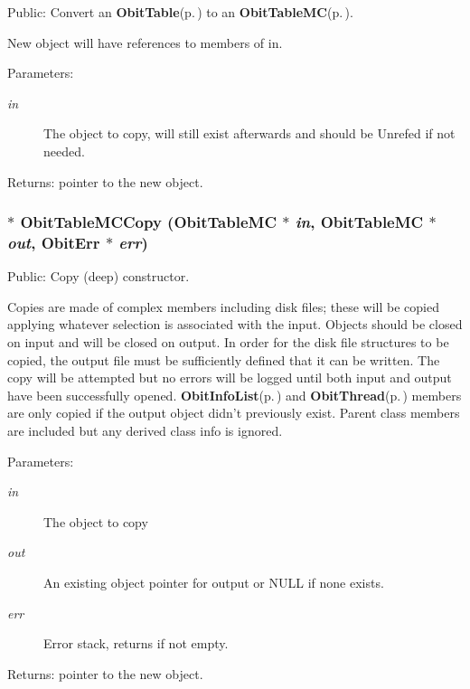 Public: Convert an {\bf Obit\-Table}{\rm (p.\,\pageref{structObitTable})} to an {\bf Obit\-Table\-MC}{\rm (p.\,\pageref{structObitTableMC})}. 

New object will have references to members of in. \begin{Desc}
\item[Parameters:]
\begin{description}
\item[{\em in}]The object to copy, will still exist afterwards and should be Unrefed if not needed. \end{description}
\end{Desc}
\begin{Desc}
\item[Returns:]pointer to the new object. \end{Desc}
\subsubsection{$\ast$ Obit\-Table\-MCCopy ({\bf Obit\-Table\-MC} $\ast$ {\em in}, {\bf Obit\-Table\-MC} $\ast$ {\em out}, {\bf Obit\-Err} $\ast$ {\em err})}\label{ObitTableMC_8h_a14}


Public: Copy (deep) constructor. 

Copies are made of complex members including disk files; these will be copied applying whatever selection is associated with the input. Objects should be closed on input and will be closed on output. In order for the disk file structures to be copied, the output file must be sufficiently defined that it can be written. The copy will be attempted but no errors will be logged until both input and output have been successfully opened. {\bf Obit\-Info\-List}{\rm (p.\,\pageref{structObitInfoList})} and {\bf Obit\-Thread}{\rm (p.\,\pageref{structObitThread})} members are only copied if the output object didn't previously exist. Parent class members are included but any derived class info is ignored. \begin{Desc}
\item[Parameters:]
\begin{description}
\item[{\em in}]The object to copy \item[{\em out}]An existing object pointer for output or NULL if none exists. \item[{\em err}]Error stack, returns if not empty. \end{description}
\end{Desc}
\begin{Desc}
\item[Returns:]pointer to the new object. \end{Desc}
